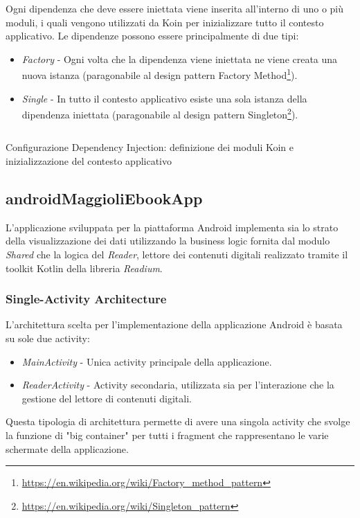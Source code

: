 Ogni dipendenza che deve essere iniettata viene inserita all'interno di uno o più moduli, i quali vengono utilizzati da Koin per inizializzare tutto il contesto applicativo. Le dipendenze possono essere principalmente di due tipi:
\begin{itemize}
    \item \textit{Factory} - Ogni volta che la dipendenza viene iniettata ne viene creata una nuova istanza (paragonabile al design pattern Factory Method\footnote{\url{https://en.wikipedia.org/wiki/Factory_method_pattern}}).
    \item \textit{Single} - In tutto il contesto applicativo esiste una sola istanza della dipendenza iniettata (paragonabile al design pattern Singleton\footnote{\url{https://en.wikipedia.org/wiki/Singleton_pattern}}).
\end{itemize}

\begin{listing}[H]
\inputminted{kotlin}{code/5-koin}
\caption{Configurazione Dependency Injection: definizione dei moduli Koin e inizializzazione del contesto applicativo}
\end{listing}

\subsection{androidMaggioliEbookApp}
L'applicazione sviluppata per la piattaforma Android implementa sia lo strato della visualizzazione dei dati utilizzando la business logic fornita dal modulo \textit{Shared} che la logica del \textit{Reader}, lettore dei contenuti digitali realizzato tramite il toolkit Kotlin della libreria \textit{Readium}.
\subsubsection{Single-Activity Architecture}
L'architettura scelta per l'implementazione della applicazione Android è basata su sole due activity:
\begin{itemize}
    \item \textit{MainActivity} - Unica activity principale della applicazione.
    \item \textit{ReaderActivity} - Activity secondaria, utilizzata sia per l'interazione che la gestione del lettore di contenuti digitali.
\end{itemize}
Questa tipologia di architettura permette di avere una singola activity che svolge la funzione di "big container" per tutti i fragment che rappresentano le varie schermate della applicazione.


